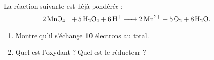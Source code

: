 \documentclass[11pt,a4paper]{article}
\begin{document}
\begin{exo}
La réaction suivante est déjà pondérée :
\[
\ce{2 MnO4^- + 5 H2O2 + 6 H+ -> 2 Mn^{2+} + 5 O2 + 8 H2O}.
\]
\begin{enumerate}[label=\alph*)]
  \item Montre qu'il s'échange \textbf{10} électrons au total.
  \item Quel est l'oxydant ? Quel est le réducteur ?
\end{enumerate}
\end{exo}
\end{document}
